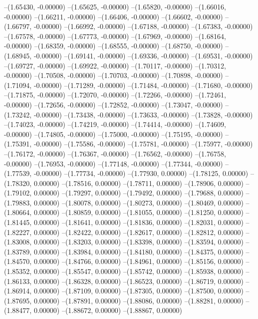 --(1.65430, -0.00000)
--(1.65625, -0.00000)
--(1.65820, -0.00000)
--(1.66016, -0.00000)
--(1.66211, -0.00000)
--(1.66406, -0.00000)
--(1.66602, -0.00000)
--(1.66797, -0.00000)
--(1.66992, -0.00000)
--(1.67188, -0.00000)
--(1.67383, -0.00000)
--(1.67578, -0.00000)
--(1.67773, -0.00000)
--(1.67969, -0.00000)
--(1.68164, -0.00000)
--(1.68359, -0.00000)
--(1.68555, -0.00000)
--(1.68750, -0.00000)
--(1.68945, -0.00000)
--(1.69141, -0.00000)
--(1.69336, -0.00000)
--(1.69531, -0.00000)
--(1.69727, -0.00000)
--(1.69922, -0.00000)
--(1.70117, -0.00000)
--(1.70312, -0.00000)
--(1.70508, -0.00000)
--(1.70703, -0.00000)
--(1.70898, -0.00000)
--(1.71094, -0.00000)
--(1.71289, -0.00000)
--(1.71484, -0.00000)
--(1.71680, -0.00000)
--(1.71875, -0.00000)
--(1.72070, -0.00000)
--(1.72266, -0.00000)
--(1.72461, -0.00000)
--(1.72656, -0.00000)
--(1.72852, -0.00000)
--(1.73047, -0.00000)
--(1.73242, -0.00000)
--(1.73438, -0.00000)
--(1.73633, -0.00000)
--(1.73828, -0.00000)
--(1.74023, -0.00000)
--(1.74219, -0.00000)
--(1.74414, -0.00000)
--(1.74609, -0.00000)
--(1.74805, -0.00000)
--(1.75000, -0.00000)
--(1.75195, -0.00000)
--(1.75391, -0.00000)
--(1.75586, -0.00000)
--(1.75781, -0.00000)
--(1.75977, -0.00000)
--(1.76172, -0.00000)
--(1.76367, -0.00000)
--(1.76562, -0.00000)
--(1.76758, -0.00000)
--(1.76953, -0.00000)
--(1.77148, -0.00000)
--(1.77344, -0.00000)
--(1.77539, -0.00000)
--(1.77734, -0.00000)
--(1.77930, 0.00000)
--(1.78125, 0.00000)
--(1.78320, 0.00000)
--(1.78516, 0.00000)
--(1.78711, 0.00000)
--(1.78906, 0.00000)
--(1.79102, 0.00000)
--(1.79297, 0.00000)
--(1.79492, 0.00000)
--(1.79688, 0.00000)
--(1.79883, 0.00000)
--(1.80078, 0.00000)
--(1.80273, 0.00000)
--(1.80469, 0.00000)
--(1.80664, 0.00000)
--(1.80859, 0.00000)
--(1.81055, 0.00000)
--(1.81250, 0.00000)
--(1.81445, 0.00000)
--(1.81641, 0.00000)
--(1.81836, 0.00000)
--(1.82031, 0.00000)
--(1.82227, 0.00000)
--(1.82422, 0.00000)
--(1.82617, 0.00000)
--(1.82812, 0.00000)
--(1.83008, 0.00000)
--(1.83203, 0.00000)
--(1.83398, 0.00000)
--(1.83594, 0.00000)
--(1.83789, 0.00000)
--(1.83984, 0.00000)
--(1.84180, 0.00000)
--(1.84375, 0.00000)
--(1.84570, 0.00000)
--(1.84766, 0.00000)
--(1.84961, 0.00000)
--(1.85156, 0.00000)
--(1.85352, 0.00000)
--(1.85547, 0.00000)
--(1.85742, 0.00000)
--(1.85938, 0.00000)
--(1.86133, 0.00000)
--(1.86328, 0.00000)
--(1.86523, 0.00000)
--(1.86719, 0.00000)
--(1.86914, 0.00000)
--(1.87109, 0.00000)
--(1.87305, 0.00000)
--(1.87500, 0.00000)
--(1.87695, 0.00000)
--(1.87891, 0.00000)
--(1.88086, 0.00000)
--(1.88281, 0.00000)
--(1.88477, 0.00000)
--(1.88672, 0.00000)
--(1.88867, 0.00000)
